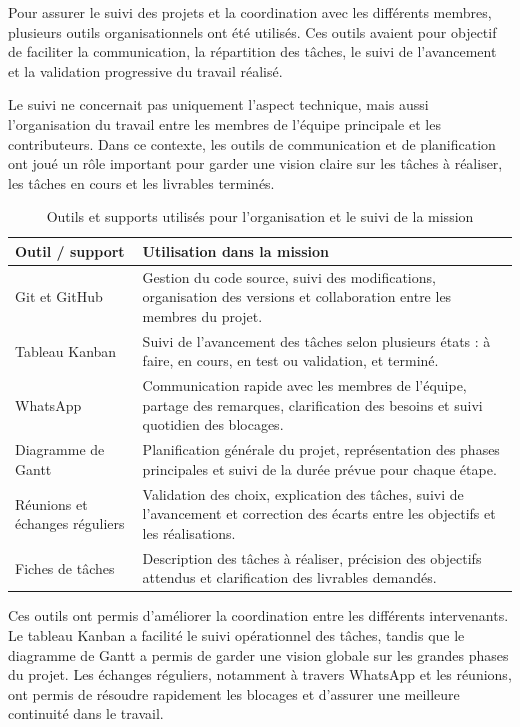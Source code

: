 Pour assurer le suivi des projets et la coordination avec les différents membres, plusieurs outils organisationnels ont été utilisés. Ces outils avaient pour objectif de faciliter la communication, la répartition des tâches, le suivi de l'avancement et la validation progressive du travail réalisé.

Le suivi ne concernait pas uniquement l'aspect technique, mais aussi l'organisation du travail entre les membres de l'équipe principale et les contributeurs. Dans ce contexte, les outils de communication et de planification ont joué un rôle important pour garder une vision claire sur les tâches à réaliser, les tâches en cours et les livrables terminés.

\begin{table}[H]
\centering
\small
\renewcommand{\arraystretch}{1.4}
\begin{tabular}{|p{4cm}|p{9.5cm}|}
\hline
\textbf{Outil / support} & \textbf{Utilisation dans la mission} \\
\hline
Git et GitHub & Gestion du code source, suivi des modifications, organisation des versions et collaboration entre les membres du projet. \\
\hline
Tableau Kanban & Suivi de l'avancement des tâches selon plusieurs états : à faire, en cours, en test ou validation, et terminé. \\
\hline
WhatsApp & Communication rapide avec les membres de l'équipe, partage des remarques, clarification des besoins et suivi quotidien des blocages. \\
\hline
Diagramme de Gantt & Planification générale du projet, représentation des phases principales et suivi de la durée prévue pour chaque étape. \\
\hline
Réunions et échanges réguliers & Validation des choix, explication des tâches, suivi de l'avancement et correction des écarts entre les objectifs et les réalisations. \\
\hline
Fiches de tâches & Description des tâches à réaliser, précision des objectifs attendus et clarification des livrables demandés. \\
\hline
\end{tabular}
\caption{Outils et supports utilisés pour l'organisation et le suivi de la mission}
\label{tab:outils-organisation-suivi}
\end{table}

Ces outils ont permis d'améliorer la coordination entre les différents intervenants. Le tableau Kanban a facilité le suivi opérationnel des tâches, tandis que le diagramme de Gantt a permis de garder une vision globale sur les grandes phases du projet. Les échanges réguliers, notamment à travers WhatsApp et les réunions, ont permis de résoudre rapidement les blocages et d'assurer une meilleure continuité dans le travail.

